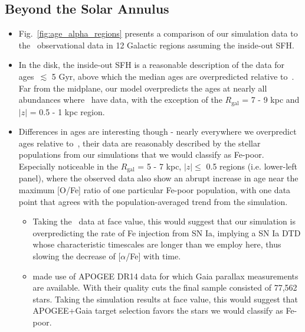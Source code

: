 \documentclass[a4paper, fleqn, usenatbib, useAMS]{mnras}
\begin{document}
\subsection{Beyond the Solar Annulus} 
\label{sec:age_alpha:beyond_solar_annulus} 
\begin{itemize} 
	\item Fig.~\ref{fig:age_alpha_regions} presents a comparison of our 
	simulation data to the~\citet{Feuillet2019} observational data in 12 
	Galactic regions assuming the inside-out SFH. 

	\item In the disk, the inside-out SFH is a reasonable description of the 
	data for ages~$\lesssim$ 5 Gyr, above which the median ages are 
	overpredicted relative to~\citet{Feuillet2019}. Far from the midplane, our 
	model overpredicts the ages at nearly all abundances 
	where~\citet{Feuillet2019} have data, with the exception of the 
	$R_\text{gal}$ = 7 - 9 kpc and $\left|z\right|$ = 0.5 - 1 kpc region. 

	\item Differences in ages are interesting though - nearly everywhere we 
	overpredict ages relative to~\citet{Feuillet2019}, their data are 
	reasonably described by the stellar populations from our simulations that 
	we would classify as Fe-poor. Especially noticeable in the $R_\text{gal}$ 
	= 5 - 7 kpc, $\left|z\right|\leq$ 0.5 regions (i.e. lower-left panel), 
	where the observed data also show an abrupt increase in age near the 
	maximum [O/Fe] ratio of one particular Fe-poor population, with one data 
	point that agrees with the population-averaged trend from the simulation. 
	\begin{itemize}
		\item Taking the~\citet{Feuillet2019} data at face value, this would 
		suggest that our simulation is overpredicting the rate of Fe injection 
		from SN Ia, implying a SN Ia DTD whose characteristic timescales are 
		longer than we employ here, thus slowing the decrease of [$\alpha$/Fe] 
		with time. 

		\item \citet{Feuillet2019} made use of APOGEE DR14 data for which 
		Gaia parallax measurements are available. With their quality cuts the 
		final sample consisted of 77,562 stars. Taking the simulation results 
		at face value, this would suggest that APOGEE+Gaia target selection 
		favors the stars we would classify as Fe-poor. 
	\end{itemize} 
\end{itemize} 
\end{document}
